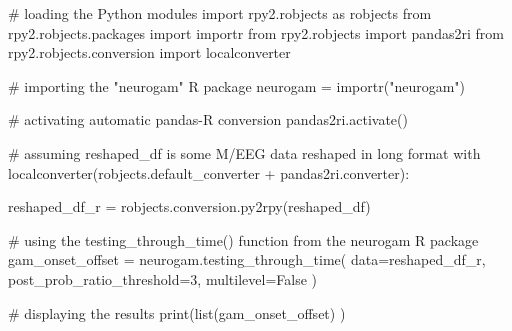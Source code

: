 \documentclass[
  doc,
  floatsintext,
  longtable,
  a4paper,
  nolmodern,
  notxfonts,
  notimes,
  colorlinks=true,linkcolor=blue,citecolor=blue,urlcolor=blue]{apa7}
\newenvironment{Shaded}{\begin{snugshade}}{\end{snugshade}}
\newcommand{\BuiltInTok}[1]{\textcolor[rgb]{0.00,0.23,0.31}{#1}}
\newcommand{\CommentTok}[1]{\textcolor[rgb]{0.37,0.37,0.37}{#1}}
\newcommand{\ControlFlowTok}[1]{\textcolor[rgb]{0.00,0.23,0.31}{#1}}
\newcommand{\DecValTok}[1]{\textcolor[rgb]{0.68,0.00,0.00}{#1}}
\newcommand{\ImportTok}[1]{\textcolor[rgb]{0.00,0.46,0.62}{#1}}
\newcommand{\NormalTok}[1]{\textcolor[rgb]{0.00,0.23,0.31}{#1}}
\newcommand{\OperatorTok}[1]{\textcolor[rgb]{0.37,0.37,0.37}{#1}}
\newcommand{\StringTok}[1]{\textcolor[rgb]{0.13,0.47,0.30}{#1}}
\newcommand{\VariableTok}[1]{\textcolor[rgb]{0.07,0.07,0.07}{#1}}
\begin{document}
\begin{Shaded}
\begin{Highlighting}[]
\CommentTok{\# loading the Python modules}
\ImportTok{import}\NormalTok{ rpy2.robjects }\ImportTok{as}\NormalTok{ robjects}
\ImportTok{from}\NormalTok{ rpy2.robjects.packages }\ImportTok{import}\NormalTok{ importr}
\ImportTok{from}\NormalTok{ rpy2.robjects }\ImportTok{import}\NormalTok{ pandas2ri}
\ImportTok{from}\NormalTok{ rpy2.robjects.conversion }\ImportTok{import}\NormalTok{ localconverter}

\CommentTok{\# importing the "neurogam" R package}
\NormalTok{neurogam }\OperatorTok{=}\NormalTok{ importr(}\StringTok{"neurogam"}\NormalTok{)}

\CommentTok{\# activating automatic pandas{-}R conversion}
\NormalTok{pandas2ri.activate()}

\CommentTok{\# assuming reshaped\_df is some M/EEG data reshaped in long format}
\ControlFlowTok{with}\NormalTok{ localconverter(robjects.default\_converter }\OperatorTok{+}\NormalTok{ pandas2ri.converter):}
    
\NormalTok{    reshaped\_df\_r }\OperatorTok{=}\NormalTok{ robjects.conversion.py2rpy(reshaped\_df)}
    

\CommentTok{\# using the testing\_through\_time() function from the neurogam R package}
\NormalTok{gam\_onset\_offset }\OperatorTok{=}\NormalTok{ neurogam.testing\_through\_time(}
\NormalTok{    data}\OperatorTok{=}\NormalTok{reshaped\_df\_r,}
\NormalTok{    post\_prob\_ratio\_threshold}\OperatorTok{=}\DecValTok{3}\NormalTok{,}
\NormalTok{    multilevel}\OperatorTok{=}\VariableTok{False}
\NormalTok{    )}

\CommentTok{\# displaying the results}
\BuiltInTok{print}\NormalTok{(}\BuiltInTok{list}\NormalTok{(gam\_onset\_offset) )}
\end{Highlighting}
\end{Shaded}
\end{document}
